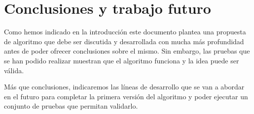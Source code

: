 \documentclass{llncs}
\begin{document}
\section{Conclusiones y trabajo futuro}
Como hemos indicado en la introducción este documento plantea una propuesta de algoritmo que debe ser discutida y desarrollada con mucha más profundidad antes de poder ofrecer conclusiones sobre el mismo.
Sin embargo, las pruebas que se han podido realizar muestran que el algoritmo funciona y la idea puede ser válida.

Más que conclusiones, indicaremos las líneas de desarrollo que se van a abordar en el futuro para completar la primera versión del algoritmo y poder ejecutar un conjunto de pruebas que permitan validarlo.








%
%

\end{document}
